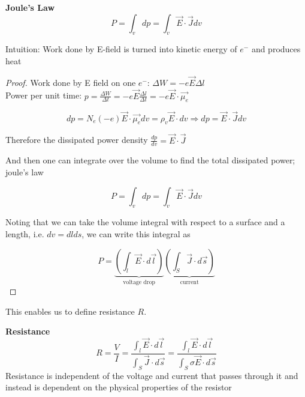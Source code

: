 \documentclass[10pt]{article}
\begin{document}
\begin{theorem}
	\textbf{Joule's Law} 
		\begin{equation}
			P = \int_{v} dp = \int_v \vec{E} \cdot \vec{J}   dv
			\label{eq:259:joules_law}
		\end{equation}

		Intuition: Work done by E-field is turned into kinetic energy of $ e^- $ and produces heat
		

	\begin{proof}

		Work done by E field on one $ e^- $: $ \Delta W = -e \vec{E} \Delta l $  \\
		Power per unit time: $ p = \frac{\Delta W}{\Delta t} = -e \vec{E} \frac{\Delta l}{\Delta t}  = -e\vec{E} \cdot \vec{\mu_e} $ 

		\begin{equation}
			dp = N_e (-e) \vec{E} \cdot \vec{\mu_e} dv = \rho_v \vec{E} \cdot  dv \Rightarrow dp = \vec{E} \cdot \vec{J} dv 
		\end{equation}

		Therefore the dissipated power density $ \frac{dp}{dv} = \vec{E} \cdot  \vec{J} $ 

		And then one can integrate over the volume to find the total dissipated power; joule's law

		\begin{equation}
			P = \int_{v} dp = \int_v \vec{E} \cdot \vec{J}   dv
		\end{equation}

		Noting that we can take the volume integral with respect to a surface and a length, i.e. $ dv = dl ds $, we can write this integral as

		\begin{equation}
			P =\underbrace{( \int_l \vec{E} \cdot  d\vec{l} )}_{\text{voltage drop}} \underbrace{(\int_S \vec{J} \cdot d\vec{s} )}_{\text{current}}
		\end{equation}
	\end{proof}
\end{theorem}

This enables us to define resistance $ R $.

\begin{definition}
	\textbf{Resistance} 
	\begin{equation}
		R= \frac{V}{I} = \frac{\int_l \vec{E} \cdot  d \vec{l}}{\int_S \vec{J} \cdot d\vec{s}} = \frac{\int_l \vec{E} \cdot  d \vec{l}}{\int_S \sigma \vec{E} \cdot d\vec{s}} 
		\label{eq:259:resistance_dfn}
	\end{equation}
	Resistance is independent of the voltage and current that passes through it and instead is dependent on the physical properties of the resistor
\end{definition}
\end{document}
